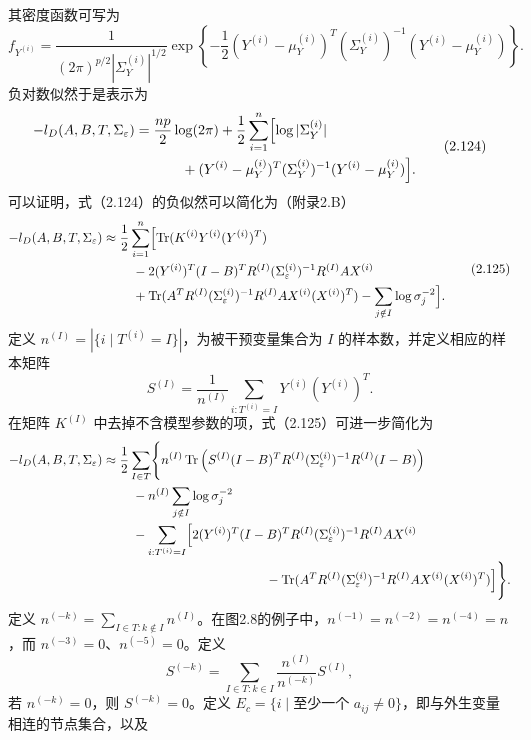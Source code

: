 其密度函数可写为
\begin{equation}
f_{Y^{(i)}}=
\frac1{(2\pi)^{p/2}|\Sigma_Y^{(i)}|^{1/2}}
\exp\left\{-\frac12(Y^{(i)}-\mu_Y^{(i)})^T
(\Sigma_Y^{(i)})^{-1}(Y^{(i)}-\mu_Y^{(i)})\right\}.
\tag{2.123}
\end{equation}
负对数似然于是表示为
\begin{equation}
\begin{aligned}
-l_D(A,B,T,\Sigma_\varepsilon)
={}&\frac{np}2\log(2\pi)
+\frac12\sum_{i=1}^{n}\Bigl[
\log|\Sigma_Y^{(i)}|\\
&\qquad+(Y^{(i)}-\mu_Y^{(i)})^T
(\Sigma_Y^{(i)})^{-1}(Y^{(i)}-\mu_Y^{(i)})\Bigr].
\end{aligned}\tag{2.124}
\end{equation}
可以证明，式（2.124）的负似然可以简化为（附录2.B）
\begin{equation}
\begin{aligned}
-l_D(A,B,T,\Sigma_\varepsilon)
\approx{}&\frac12\sum_{i=1}^{n}\Bigl[
\operatorname{Tr}(K^{(i)}Y^{(i)}(Y^{(i)})^T)\\
&\quad-2(Y^{(i)})^T(I-B)^TR^{(I)}
(\Sigma_\varepsilon^{(i)})^{-1}R^{(I)}AX^{(i)}\\
&\quad+\operatorname{Tr}(A^TR^{(I)}(\Sigma_\varepsilon^{(i)})^{-1}
R^{(I)}AX^{(i)}(X^{(i)})^T)
-\sum_{j\notin I}\log\sigma_j^{-2}\Bigr].
\end{aligned}\tag{2.125}
\end{equation}
定义 $n^{(I)}=|\{i\mid T^{(i)}=I\}|$，为被干预变量集合为 $I$ 的样本数，并定义相应的样本矩阵
\[
S^{(I)}=\frac1{n^{(I)}}\sum_{i:T^{(i)}=I}Y^{(i)}(Y^{(i)})^T.
\]
在矩阵 $K^{(I)}$ 中去掉不含模型参数的项，式（2.125）可进一步简化为
\[
\begin{aligned}
-l_D(A,B,T,\Sigma_\varepsilon)
\approx{}&\frac12\sum_{I\in T}\Biggl\{
n^{(I)}\Tr\left(S^{(I)}(I-B)^TR^{(I)}
(\Sigma_\varepsilon^{(i)})^{-1}R^{(I)}(I-B)\right)\\
&\quad-n^{(I)}\sum_{j\notin I}\log\sigma_j^{-2}\\
&\quad-\sum_{i:T^{(i)}=I}\Bigl[
2(Y^{(i)})^T(I-B)^TR^{(I)}
(\Sigma_\varepsilon^{(i)})^{-1}R^{(I)}AX^{(i)}\\
&\hspace{4cm}
-\Tr(A^TR^{(I)}(\Sigma_\varepsilon^{(i)})^{-1}
R^{(I)}AX^{(i)}(X^{(i)})^T)\Bigr]\Biggr\}.
\end{aligned}
\]
定义 $n^{(-k)}=\sum_{I\in T:k\notin I}n^{(I)}$。在图2.8的例子中，$n^{(-1)}=n^{(-2)}=n^{(-4)}=n$，而 $n^{(-3)}=0$、$n^{(-5)}=0$。定义
\[
S^{(-k)}=\sum_{I\in T:k\in I}\frac{n^{(I)}}{n^{(-k)}}S^{(I)},
\]
若 $n^{(-k)}=0$，则 $S^{(-k)}=0$。定义 $E_c=\{i\mid\text{至少一个 }a_{ij}\ne0\}$，即与外生变量相连的节点集合，以及
